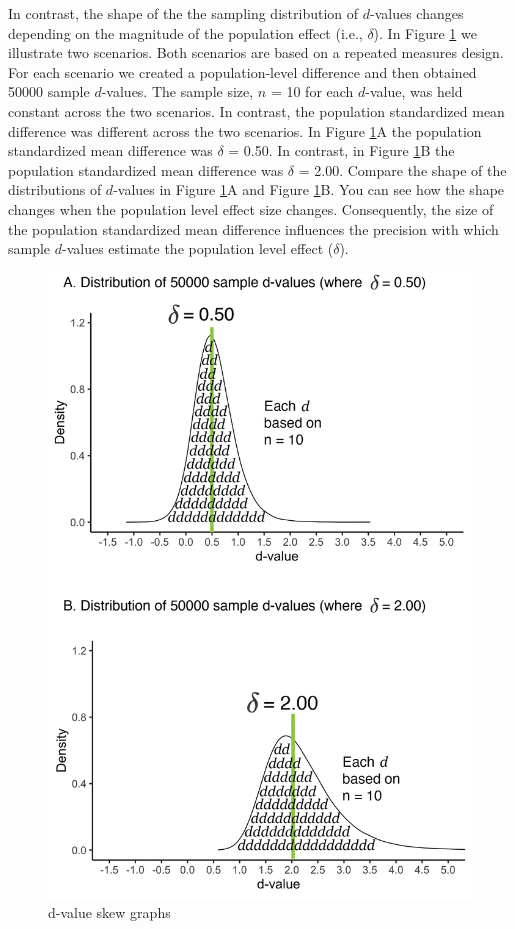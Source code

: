 \documentclass[
]{krantz}
\begin{document}
In contrast, the shape of the the sampling distribution of \(d\)-values changes depending on the magnitude of the population effect (i.e., \(\delta\)). In Figure \ref{fig:dvalueskew} we illustrate two scenarios. Both scenarios are based on a repeated measures design. For each scenario we created a population-level difference and then obtained 50000 sample \(d\)-values. The sample size, \(n\) = 10 for each \(d\)-value, was held constant across the two scenarios. In contrast, the population standardized mean difference was different across the two scenarios. In Figure \ref{fig:dvalueskew}A the population standardized mean difference was \(\delta\) = 0.50. In contrast, in Figure \ref{fig:dvalueskew}B the population standardized mean difference was \(\delta\) = 2.00. Compare the shape of the distributions of \(d\)-values in Figure \ref{fig:dvalueskew}A and Figure \ref{fig:dvalueskew}B. You can see how the shape changes when the population level effect size changes. Consequently, the size of the population standardized mean difference influences the precision with which sample \(d\)-values estimate the population level effect (\(\delta\)).

\begin{figure}
\includegraphics[width=0.8\linewidth]{ch_samples_precision/images/d_sampling_dist_delta_vary} \caption{d-value skew graphs}\label{fig:dvalueskew}
\end{figure}
\end{document}
